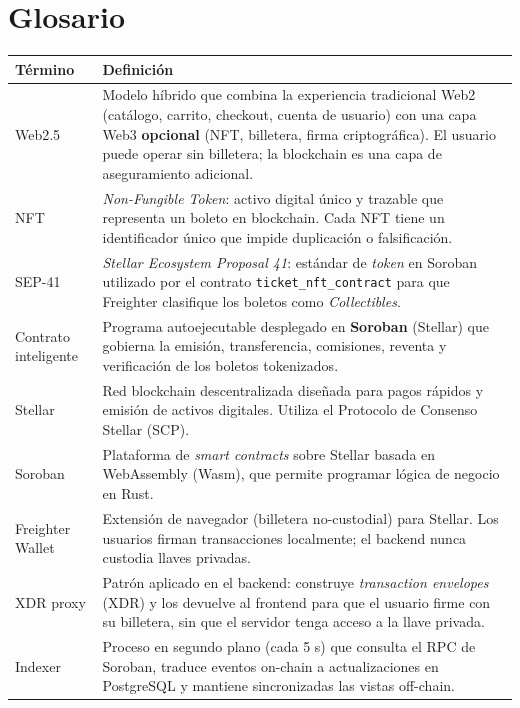 \documentclass[12pt,oneside]{report}
\begin{document}
  \section{Glosario}
  \label{sec:glosario}
    \begin{longtable}{@{}p{3.8cm} p{10.7cm}@{}}
      \toprule
      \textbf{Término} & \textbf{Definición}\\
      \midrule
      \endhead
      \bottomrule
      \endfoot
      Web2.5 & Modelo híbrido que combina la experiencia tradicional Web2 (catálogo, carrito, checkout, cuenta de usuario) con una capa Web3 \textbf{opcional} (NFT, billetera, firma criptográfica). El usuario puede operar sin billetera; la blockchain es una capa de aseguramiento adicional.\\
      NFT & \textit{Non-Fungible Token}: activo digital único y trazable que representa un boleto en blockchain. Cada NFT tiene un identificador único que impide duplicación o falsificación.\\
      SEP-41 & \textit{Stellar Ecosystem Proposal 41}: estándar de \textit{token} en Soroban utilizado por el contrato \texttt{ticket\_nft\_contract} para que Freighter clasifique los boletos como \textit{Collectibles}.\\
      Contrato inteligente & Programa autoejecutable desplegado en \textbf{Soroban} (Stellar) que gobierna la emisión, transferencia, comisiones, reventa y verificación de los boletos tokenizados.\\
      Stellar & Red blockchain descentralizada diseñada para pagos rápidos y emisión de activos digitales. Utiliza el Protocolo de Consenso Stellar (SCP).\\
      Soroban & Plataforma de \textit{smart contracts} sobre Stellar basada en WebAssembly (Wasm), que permite programar lógica de negocio en Rust.\\
      Freighter Wallet & Extensión de navegador (billetera no-custodial) para Stellar. Los usuarios firman transacciones localmente; el backend nunca custodia llaves privadas.\\
      XDR proxy & Patrón aplicado en el backend: construye \textit{transaction envelopes} (XDR) y los devuelve al frontend para que el usuario firme con su billetera, sin que el servidor tenga acceso a la llave privada.\\
      Indexer & Proceso en segundo plano (cada 5 s) que consulta el RPC de Soroban, traduce eventos on-chain a actualizaciones en PostgreSQL y mantiene sincronizadas las vistas off-chain.\\

\end{longtable}
\end{document}
